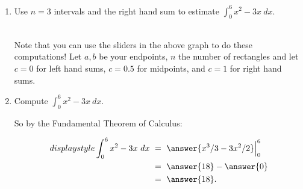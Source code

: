 \documentclass{ximera}
\begin{document}
\begin{question}
\begin{enumerate}
\begin{explanation}
\end{explanation}



\item Use $n=3$ intervals and the right hand sum to estimate $\displaystyle\int_0^6 x^2-3x\ dx$. \\ \\
 Note that you can use the sliders in the above graph to do these computations!  Let $a,b$ be your endpoints, $n$ the number of rectangles and let $c=0$ for left hand sums, $c=0.5$ for midpoints, and $c=1$ for right hand sums.


\item Compute $\displaystyle\int_0^6 x^2-3x\ dx$. 
\begin{explanation}
So by the Fundamental Theorem of Calculus:

\begin{align*}
displaystyle\int_0^6 x^2-3x\ dx&\ =\ \answer{x^3/3-3x^2/2}\Big|_0^6\\
&\ =\ \answer{18}-\answer{0}\\
&\ =\ \answer{18}.
\end{align*}



\end{explanation}



\end{enumerate}


\end{question}
\end{document}
